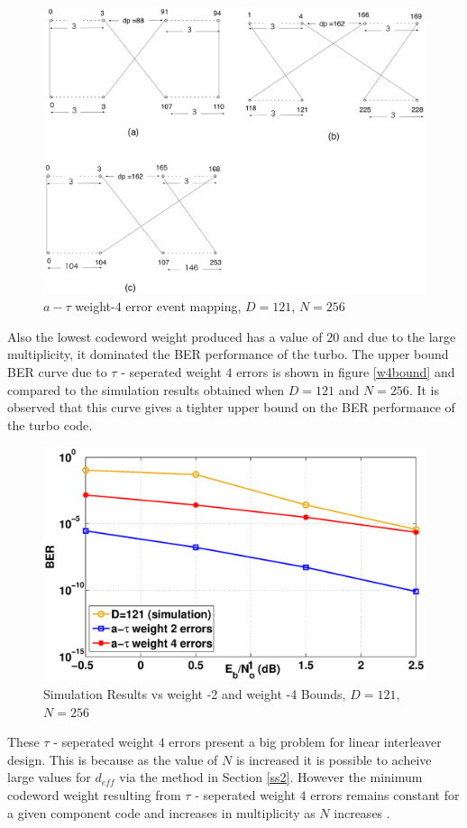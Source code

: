 \documentclass[a4paper, 12pt, oneside, openary]{jbook}
\begin{document}
\begin{figure}[h!]
\centering
\includegraphics[width=\textwidth]{exampleswt4.eps}
\caption{$a-\tau$ weight-$4$ error event mapping, $D=121$, $N=256$}
\label{wt4example}
\end{figure}

 Also the lowest codeword weight produced has a value of $20$ and due to the large multiplicity, it dominated the BER performance of the turbo. The upper bound BER curve due to $\tau$ - seperated weight $4$ errors is shown in figure \ref{w4bound} and compared to the simulation results obtained when $D= 121$ and $N=256$. It is observed that this curve gives a tighter upper bound on the BER performance of the turbo code.
 \begin{figure}[h!]
\centering
\includegraphics[width=\textwidth]{D_121_N_256_sim_vs_theory.eps}
\caption{Simulation Results vs weight -2 and weight -4 Bounds, $D=121$, $N=256$}
\label{wt4bound}
\end{figure}
 These $\tau$ - seperated weight $4$ errors present a big problem for linear interleaver design. This is because as the value of $N$ is increased it is possible to acheive large values for $d_{eff}$ via the method in Section \ref{ss2}. However the minimum codeword weight resulting from $\tau$ - seperated weight $4$ errors remains constant for a given component code and increases in multiplicity as $N$ increases \cite{ref2}.
 
\end{document}
